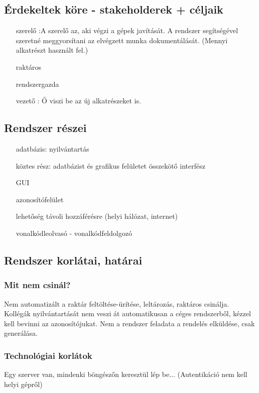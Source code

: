 \documentclass[11pt]{article}\usepackage[left=20mm,right=20mm,top=15mm,bottom=20mm]{geometry}
\begin{document}
\subsection{Érdekeltek köre - stakeholderek + céljaik}
\begin{itemize}
\item[szerelő] :A szerelő az, aki végzi a gépek javítását. A rendszer segítségével szeretné meggyorsítani az elvégzett munka dokumentálását. (Mennyi alkatrészt használt fel.)
\item[] raktáros
\item[rendszergazda]
\item[vezető]: Ő viszi be az új alkatrészeket is.
\end{itemize}

\subsection{Rendszer részei}
\begin{itemize}
\item[] adatbázis: nyilvántartás
\item[] köztes rész: adatbázist és grafikus felületet összekötő interfész
\item[] GUI
\item[] azonosítófelület
\item[] lehetőség távoli hozzáférésre (helyi hálózat, internet)
\item[] vonalkódleolvasó - vonalkódfeldolgozó
\end{itemize}

\subsection{Rendszer korlátai, határai}
\subsubsection{Mit nem csinál?}
Nem automatizált a raktár feltöltése-ürítése, leltározás, raktáros csinálja.
Kollégák nyilvántartását nem veszi át automatikusan a céges rendszerből, kézzel kell bevinni az azonosítójukat.
Nem a rendszer feladata a rendelés elküldése, csak generálása.

\subsubsection{Technológiai korlátok}
Egy szerver van, mindenki böngészőn keresztül lép be...
(Autentikáció nem kell helyi gépről)
\end{document}

